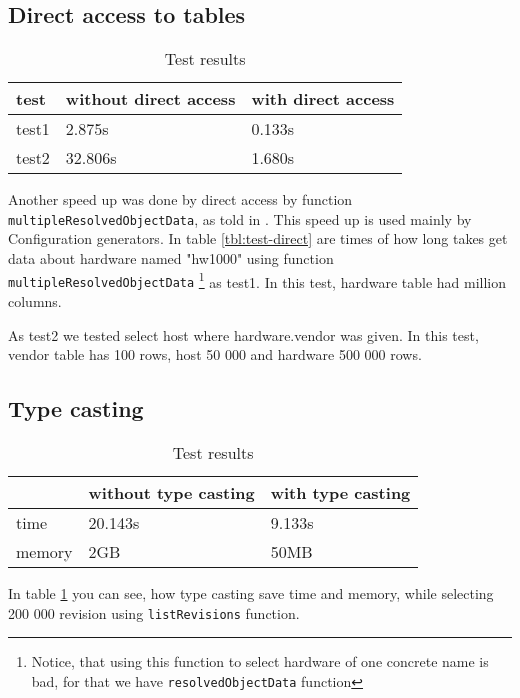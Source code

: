 \documentclass[deska]{subfiles}
\begin{document}
\subsection{Direct access to tables}
\label{sec:test-direct}

\label{tbl:test-direct}
\begin{longtable}{ l | l | l }
\caption{Test results}\\
test & without direct access & with direct access \\
\hline
\endhead
test1 & 2.875s & 0.133s \\
test2 & 32.806s & 1.680s \\
\end{longtable}

Another speed up was done by direct access by function {\tt multipleResolvedObjectData}, as told in .
This speed up is used mainly by Configuration generators.
In table \ref{tbl:test-direct} are times of how long takes get data about hardware named "hw1000" using function {\tt multipleResolvedObjectData}
\footnote{Notice, that using this function to select hardware of one concrete name is bad, for that we have
{\tt resolvedObjectData} function}
as test1. In this test, hardware table had million columns.

As test2 we tested select host where hardware.vendor was given. In this test, vendor table
has 100 rows, host 50 000 and hardware 500 000 rows.

\subsection{Type casting}
\label{sec:test-cast}

\begin{longtable}{ l | l | l }
\caption{Test results}
\label{tbl:test-casting-cmp}\\
& without type casting & with type casting \\
\hline
\endhead
time & 20.143s & 9.133s \\
memory & 2GB & 50MB \\
\end{longtable}

In table \ref{tbl:test-casting-cmp} you can see, how type casting save time and memory,
while selecting 200 000 revision using {\tt listRevisions} function.
\end{document}
